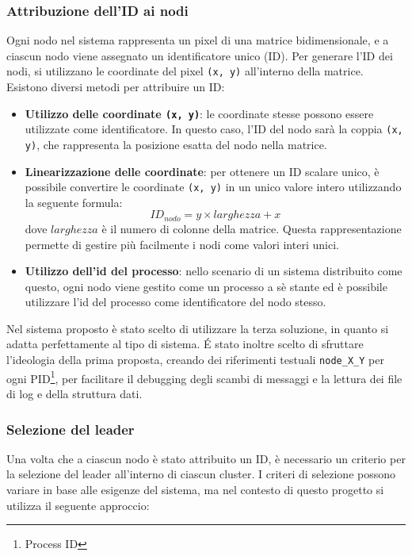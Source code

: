 \documentclass[12pt, a4paper]{report}
\begin{document}
\subsubsection{Attribuzione dell'ID ai nodi}

Ogni nodo nel sistema rappresenta un pixel di una matrice bidimensionale, e a ciascun nodo viene assegnato un identificatore unico (ID). Per generare l'ID dei nodi, si utilizzano le coordinate del pixel \texttt{(x, y)} all'interno della matrice. Esistono diversi metodi per attribuire un ID:

\begin{itemize}
    \item \textbf{Utilizzo delle coordinate \texttt{(x, y)}}: le coordinate stesse possono essere utilizzate come identificatore. In questo caso, l'ID del nodo sar\`a la coppia \texttt{(x, y)}, che rappresenta la posizione esatta del nodo nella matrice.
    
    \item \textbf{Linearizzazione delle coordinate}: per ottenere un ID scalare unico, \`e possibile convertire le coordinate \texttt{(x, y)} in un unico valore intero utilizzando la seguente formula:
    \[
    ID_{nodo} = y \times larghezza + x
    \]
    dove $larghezza$ \`e il numero di colonne della matrice. Questa rappresentazione permette di gestire pi\`u facilmente i nodi come valori interi unici.

    \item \textbf{Utilizzo dell'id del processo}: nello scenario di un sistema distribuito come questo, ogni nodo viene gestito come un processo a s\`e stante ed \`e possibile utilizzare l'id del processo come identificatore del nodo stesso.

\end{itemize}

Nel sistema proposto \`e stato scelto di utilizzare la terza soluzione, in quanto si adatta perfettamente al tipo di sistema. \'E stato inoltre scelto di sfruttare l'ideologia della prima proposta, creando dei riferimenti testuali \texttt{node\_X\_Y} per ogni PID\footnote{Process ID}, per facilitare il debugging degli scambi di messaggi e la lettura dei file di log e della struttura dati.

\subsubsection{Selezione del leader}

Una volta che a ciascun nodo \`e stato attribuito un ID, \`e necessario un criterio per la selezione del leader all'interno di ciascun cluster. I criteri di selezione possono variare in base alle esigenze del sistema, ma nel contesto di questo progetto si utilizza il seguente approccio:
\end{document}

